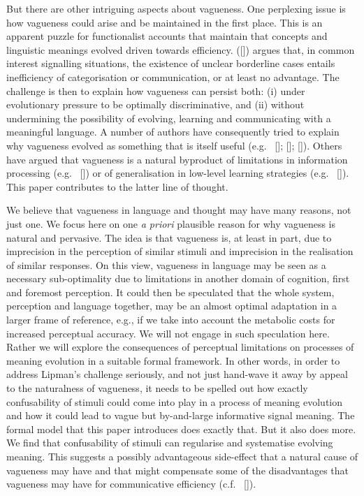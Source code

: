 \documentclass[12pt,english]{article}
\numberwithin{equation}{section}
\newcommand{\citetbjps}[1]{\citeauthor{#1} ([\citeyear{#1}])}
\newcommand{\citealtbjps}[1]{\citeauthor{#1} [\citeyear{#1}]}
\newcommand{\citepbjpspre}[2]{(#1~\citeauthor{#2} [\citeyear{#2}])}
\begin{document}
But there are other intriguing aspects about vagueness. One perplexing issue is how vagueness
could arise and be maintained in the first place. This is an apparent puzzle for functionalist
accounts that maintain that concepts and linguistic meanings evolved driven towards
efficiency. \citetbjps{Lipman2009:Why-is-Language} argues that, in common interest signalling
situations, the existence of unclear borderline cases entails inefficiency of categorisation or
communication, or at least no advantage. The challenge is then to explain how vagueness
can persist both: (i) under evolutionary pressure to be optimally discriminative, and (ii)
without undermining the possibility of evolving, learning and communicating with a meaningful
language. A number of authors have consequently tried to explain why vagueness evolved as
something that is itself useful
(e.g.~\citealtbjps{Jaegherde-Jaegher2003:A-Game-Theoreti}; \citealtbjps{Deemter2009:Utility-and-Lan}; \citealtbjps{BlumeBoard2013:Intentional-Vag}).
Others have argued that vagueness is a natural byproduct of limitations in information
processing \citepbjpspre{e.g.}{FrankeJager2010:Vagueness-Signa} or of generalisation in low-level
learning strategies \citepbjpspre{e.g.}{OConnor2013:The-Evolution-o}. This paper contributes to the
latter line of thought.

We believe that vagueness in language and thought may have many reasons, not just one. We focus
here on one \emph{a priori} plausible reason for why vagueness is natural and pervasive. The
idea is that vagueness is, at least in part, due to imprecision in the perception of similar
stimuli and imprecision in the realisation of similar responses. On this view, vagueness in
language may be seen as a necessary sub-optimality due to limitations in another domain of
cognition, first and foremost perception. It could then be speculated that the whole system,
perception and language together, may be an almost optimal adaptation in a larger frame
of reference, e.g., if we take into account the metabolic costs for increased perceptual
accuracy. We will not engage in such speculation here. Rather we will explore the consequences
of perceptual limitations on processes of meaning evolution in a suitable formal framework. In
other words, in order to address Lipman's challenge seriously, and not just hand-wave it away
by appeal to the naturalness of vagueness, it needs to be spelled out how exactly confusability
of stimuli could come into play in a process of meaning evolution and how it could lead to
vague but by-and-large informative signal meaning. The formal model that this paper introduces
does exactly that. But it also does more. We find that confusability of stimuli can regularise
and systematise evolving meaning. This suggests a possibly advantageous side-effect that a
natural cause of vagueness may have and that might compensate some of the disadvantages that
vagueness may have for communicative efficiency \citepbjpspre{c.f.}{OConnor2013:The-Evolution-o}.
\end{document}
